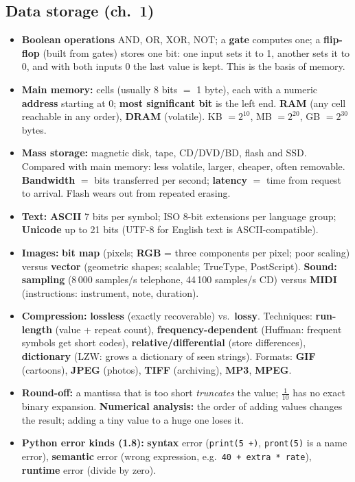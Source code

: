 \documentclass{fkt-notes}
\begin{document}
\subsection{Data storage (ch.~1)}
\begin{itemize}[nosep]
  \item \textbf{Boolean operations} AND, OR, XOR, NOT; a \textbf{gate} computes one; a \textbf{flip-flop} (built from gates) stores one bit:
        one input sets it to 1, another sets it to 0, and with both inputs 0 the last value is kept. This is the basis of memory.
  \item \textbf{Main memory:} cells (usually 8 bits $=$ 1 byte), each with a numeric \textbf{address} starting at 0; \textbf{most significant bit} is the left end.
        \textbf{RAM} (any cell reachable in any order), \textbf{DRAM} (volatile). KB $=2^{10}$, MB $=2^{20}$, GB $=2^{30}$ bytes.
  \item \textbf{Mass storage:} magnetic disk, tape, CD/DVD/BD, flash and SSD. Compared with main memory: less volatile, larger, cheaper, often removable.
        \textbf{Bandwidth} $=$ bits transferred per second; \textbf{latency} $=$ time from request to arrival. Flash wears out from repeated erasing.
  \item \textbf{Text:} \textbf{ASCII} 7 bits per symbol; ISO 8-bit extensions per language group; \textbf{Unicode} up to 21 bits (UTF-8 for English text is ASCII-compatible).
  \item \textbf{Images:} \textbf{bit map} (pixels; \textbf{RGB} = three components per pixel; poor scaling) versus \textbf{vector} (geometric shapes; scalable; TrueType, PostScript).
        \textbf{Sound:} \textbf{sampling} (8\,000 samples/s telephone, 44\,100 samples/s CD) versus \textbf{MIDI} (instructions: instrument, note, duration).
  \item \textbf{Compression:} \textbf{lossless} (exactly recoverable) vs.\ \textbf{lossy}. Techniques: \textbf{run-length} (value + repeat count),
        \textbf{frequency-dependent} (Huffman: frequent symbols get short codes), \textbf{relative/differential} (store differences), \textbf{dictionary}
        (LZW: grows a dictionary of seen strings). Formats: \textbf{GIF} (cartoons), \textbf{JPEG} (photos), \textbf{TIFF} (archiving), \textbf{MP3}, \textbf{MPEG}.
  \item \textbf{Round-off:} a mantissa that is too short \emph{truncates} the value; $\frac1{10}$ has no exact binary expansion.
        \textbf{Numerical analysis:} the order of adding values changes the result; adding a tiny value to a huge one loses it.
  \item \textbf{Python error kinds (1.8):} \textbf{syntax} error (\texttt{print(5 +)}, \texttt{pront(5)} is a name error), \textbf{semantic} error
        (wrong expression, e.g.\ \texttt{40 + extra * rate}), \textbf{runtime} error (divide by zero).
\end{itemize}
\end{document}
